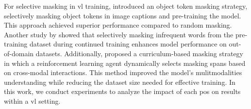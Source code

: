For selective masking in \acrshort{vl} training,  introduced an object token masking strategy, selectively masking object tokens in image captions and pre-training the model. 
This approach achieved superior performance compared to random masking. 
Another study by  showed that selectively masking infrequent words from the pre-training dataset during continued training enhances model performance on out-of-domain datasets. 
Additionally, \cite{rf-curriculum-masking} proposed a curriculum-based masking strategy in which a reinforcement learning agent dynamically selects masking spans based on cross-modal interactions. 
This method improved the model’s mulitmodalities understanding while reducing the dataset size needed for effective training. 
In this work, we conduct experiments to analyze the impact of each \acrshort{pos} on results within a \acrshort{vl} setting.





